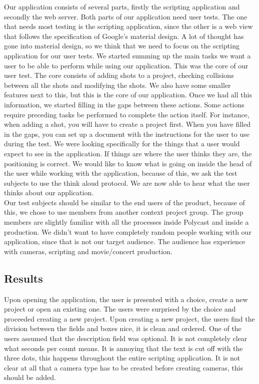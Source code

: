 Our application consists of several parts, firstly the scripting application and secondly the web server. Both parts of our application need user tests. The one that needs most testing is the scripting application, since the other is a web view that follows the specification of Google's material design. A lot of thought has gone into material design, so we think that we need to focus on the scripting application for our user tests. We started summing up the main tasks we want a user to be able to perform while using our application. This was the core of our user test. The core consists of adding shots to a project, checking collisions between all the shots and modifying the shots. We also have some smaller features next to this, but this is the core of our application. Once we had all this information, we started filling in the gaps between these actions. Some actions require preceding tasks be performed to complete the action itself. For instance, when adding a shot, you will have to create a project first. When you have filled in the gaps, you can set up a document with the instructions for the user to use during the test. We were looking specifically for the things that a user would expect to see in the application. If things are where the user thinks they are, the positioning is correct. We would like to know what is going on inside the head of the user while working with the application, because of this, we ask the test subjects to use the think aloud protocol. We are now able to hear what the user thinks about our application.\\

Our test subjects should be similar to the end users of the product, because of this, we chose to use members from another context project group. The group members are slightly familiar with all the processes inside Polycast and inside a production. We didn't want to have completely random people working with our application, since that is not our target audience. The audience has experience with cameras, scripting and movie/concert production.
\subsection{Results}
Upon opening the application, the user is presented with a choice, create a new project or open an existing one. The users were surprised by the choice and proceeded creating a new project. Upon creating a new project, the users find the division between the fields and boxes nice, it is clean and ordered. One of the users assumed that the description field was optional. It is not completely clear what seconds per count means. It is annoying that the text is cut off with the three dots, this happens throughout the entire scripting application. It is not clear at all that a camera type has to be created before creating cameras, this should be added.\\

